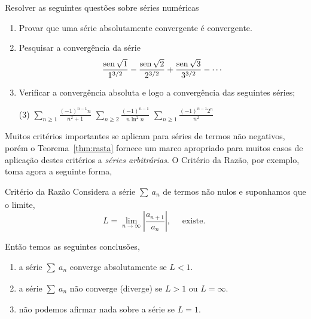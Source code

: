 Resolver as seguintes quest\~{o}es sobre 
s\'{e}ries num\'{e}ricas
\begin{enumerate}[label=\rm{(\arabic*)},leftmargin=4ex,ref=\rm{(\arabic*)}]
  \item Provar que uma s\'erie absolutamente convergente \'e
  convergente.
  \item Pesquisar a converg\^encia da s\'erie
\begin{equation*}
  \frac{\operatorname{sen}\sqrt{1}}{1^{3/2}}-\frac{\operatorname{sen}\sqrt{2}}{2^{3/2}}+\frac{\operatorname{sen}\sqrt{3}}{3^{3/2}}-\cdots
\end{equation*}
  \item Verificar a converg\^encia absoluta e logo a converg\^encia
  das seguintes s\'eries;
\begin{tasks}[label=(\alph*),item-indent=3em,label-width=4ex,ref=(\alph*)](3)
\task \(\displaystyle{\sum_{n\geq 1}\frac{(-1)^{n-1}n}{n^2+1}}\)
\task \(\displaystyle{\sum_{n\geq 2}\frac{(-1)^{n-1}}{n\ln^2 n}}\)
\task \(\displaystyle{\sum_{n\geq 1}\frac{(-1)^{n-1}2^n}{n^2}}\)
\end{tasks}
\end{enumerate}

Muitos crit\'{e}rios importantes se aplicam para s\'{e}ries de termos n\~{a}o
negativos, por\'{e}m o Teorema~\ref{thm:rasta} fornece  um marco apropriado
para muitos casos de aplica\c{c}\~{a}o destes crit\'{e}rios a \textit{séries
arbitrárias}. O Crit\'{e}rio da Raz\~{a}o, por exemplo, toma agora a
seguinte forma,

\begin{theoc}{Crit\'{e}rio da Raz\~{a}o}{}
Considera a s\'{e}rie $\sum_{}\,a_{n}$ de termos n\~{a}o nulos e
suponhamos que o limite,
\begin{equation*}
  L=\lim_{n\to\infty}\left|\frac{a_{n+1}}{a_n}\right|,\quad \text{ existe. }
\end{equation*}

Ent\~{a}o temos as seguintes conclus\~{o}es,
\begin{enumerate}[label=\rm{(\alph*)},leftmargin=4em, ref=\rm{(\alph*)}]
  \item a s\'{e}rie $\sum_{}\,a_{n}$ converge absolutamente  se $L<1$.
  \item a s\'{e}rie $\sum_{}\,a_{n}$ n\~{a}o converge (diverge) se $L>1$ ou \(L=\infty\).
  \item n\~{a}o podemos afirmar nada sobre a s\'{e}rie se $L=1$.
\end{enumerate}
\end{theoc}

